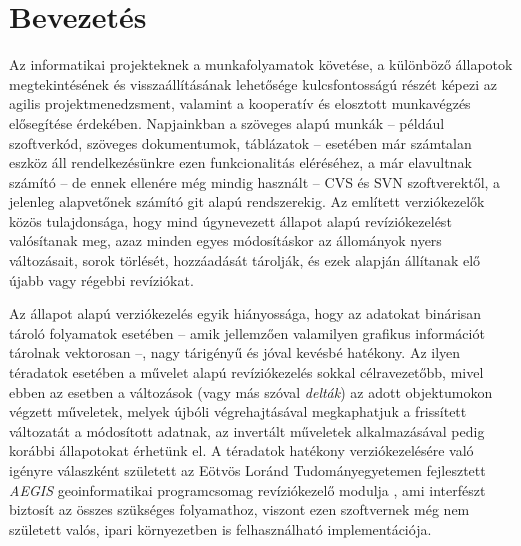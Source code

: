 \chapter{Bevezetés}
\label{ch:intro}

Az informatikai projekteknek a munkafolyamatok követése, a különböző állapotok megtekintésének és visszaállításának lehetősége kulcsfontosságú részét képezi az agilis projektmenedzsment, valamint a kooperatív és elosztott munkavégzés elősegítése érdekében. Napjainkban a szöveges alapú munkák -- például szoftverkód, szöveges dokumentumok, táblázatok -- esetében már számtalan eszköz áll rendelkezésünkre ezen funkcionalitás eléréséhez, a már elavultnak számító -- de ennek ellenére még mindig használt -- CVS és SVN szoftverektől, a jelenleg alapvetőnek számító git alapú rendszerekig.
Az említett verziókezelők közös tulajdonsága, hogy mind úgynevezett állapot alapú revíziókezelést valósítanak meg, azaz minden egyes módosításkor az állományok nyers változásait, sorok törlését, hozzáadását tárolják, és ezek alapján állítanak elő újabb vagy régebbi revíziókat.

Az állapot alapú verziókezelés egyik hiányossága, hogy az adatokat binárisan tároló folyamatok esetében -- amik jellemzően valamilyen grafikus információt tárolnak vektorosan --, nagy tárigényű és jóval kevésbé hatékony.
Az ilyen téradatok esetében a művelet alapú revíziókezelés sokkal célravezetőbb, mivel ebben az esetben a változások (vagy más szóval \emph{delták}) az adott objektumokon végzett műveletek, melyek újbóli végrehajtásával megkaphatjuk a frissített változatát a módosított adatnak, az invertált műveletek alkalmazásával pedig korábbi állapotokat érhetünk el.
A téradatok hatékony verziókezelésére való igényre válaszként született az Eötvös Loránd Tudományegyetemen fejlesztett \emph{AEGIS} geoinformatikai programcsomag \cite{giachetta2013aegis, aegis} revíziókezelő modulja \cite{cserep2013versioning,cserep2015operation}, ami interfészt biztosít az összes szükséges folyamathoz, viszont ezen szoftvernek még nem született valós, ipari környezetben is felhasználható implementációja.

